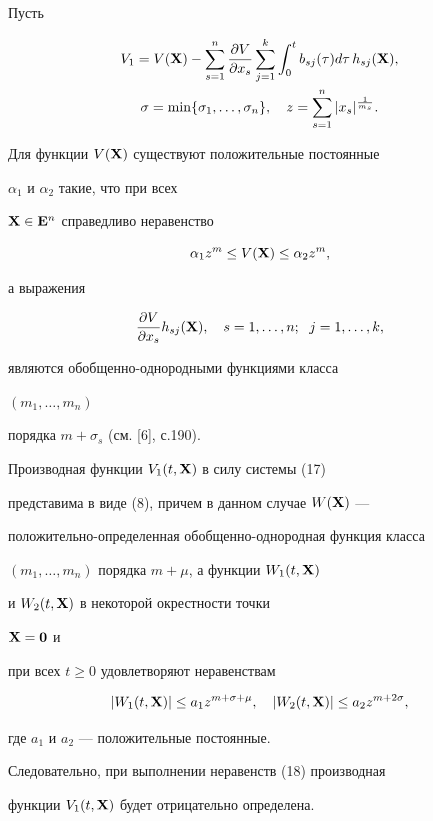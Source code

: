 \begin{pf} Пусть 


\begin{gather} 


V_1=V(\bx)-\sum^n_{s=1} 


\frac{\partial V}{\partial x_s}\sum^k_{j=1}\int^t_0 


b_{sj}(\tau)d\tau\,h_{sj}(\bx),\\ 


\sigma=\min\{\sigma_1,\dotsc,\sigma_n\},\quad 


z=\sum^n_{s=1}|x_s|^{\frac{1}{m_s}}.\notag 


\end{gather} 


Для функции $V(\bold X)$ существуют положительные постоянные 


$\alpha_1$ и $\alpha_2$ такие, что при всех 


$\bold X\in\bold E^n$ справедливо неравенство 


$$ 


\alpha_1z^m\le V(\bx)\le \alpha_2 z^m, 


$$ 


а выражения 


$$ 


\frac{\partial V}{\partial x_s}h_{sj}(\bx),\quad 


s=1,\dotsc,n;\ \; j=1,\dotsc,k, 


$$ 


являются обобщенно-однородными функциями класса 


$(m_1,\dotsc,m_n)$ 


порядка $m+\sigma_s$ (см. [6], с.190). 


 


Производная функции $V_1(t,\bold X)$ в силу системы (17) 


представима в виде (8), причем в данном случае $W(\bold X)$ --- 


положительно-определенная обобщенно-однородная функция класса 


$(m_1,\dotsc,m_n)$ порядка $m+\mu$, а функции $W_1(t,\bold X)$ 


и $W_2(t,\bold X)$ в некоторой окрестности точки 


$\bold X=\bold 0$ и 


при всех $t\ge 0$ удовлетворяют неравенствам 


$$ 


|W_1(t,\bx)|\le a_1 z^{m+\sigma+\mu},\quad 


|W_2(t,\bx)|\le a_2 z^{m+2\sigma}, 


$$ 


где $a_1$ и $a_2$ --- положительные постоянные. 


 


Следовательно, при выполнении неравенств (18) производная 


функции $V_1(t,\bold X)$ будет отрицательно определена. 


\end{pf} 


